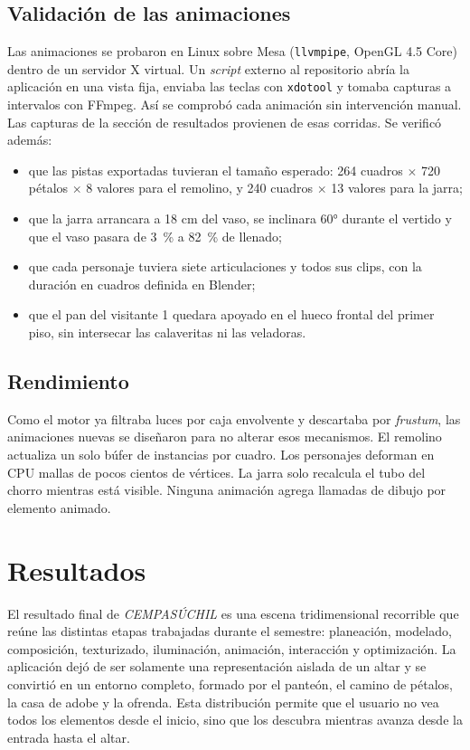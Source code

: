 \documentclass[letter,12pt]{article}
\begin{document}
	\subsection{Validación de las animaciones}
	Las animaciones se probaron en Linux sobre Mesa (\texttt{llvmpipe}, OpenGL 4.5 Core) dentro de un servidor X virtual. Un \textit{script} externo al repositorio abría la aplicación en una vista fija, enviaba las teclas con \texttt{xdotool} y tomaba capturas a intervalos con FFmpeg. Así se comprobó cada animación sin intervención manual. Las capturas de la sección de resultados provienen de esas corridas. Se verificó además:
	\begin{itemize}[leftmargin=*]
		\item que las pistas exportadas tuvieran el tamaño esperado: 264 cuadros $\times$ 720 pétalos $\times$ 8 valores para el remolino, y 240 cuadros $\times$ 13 valores para la jarra;
		\item que la jarra arrancara a 18 cm del vaso, se inclinara 60° durante el vertido y que el vaso pasara de 3~\% a 82~\% de llenado;
		\item que cada personaje tuviera siete articulaciones y todos sus clips, con la duración en cuadros definida en Blender;
		\item que el pan del visitante 1 quedara apoyado en el hueco frontal del primer piso, sin intersecar las calaveritas ni las veladoras.
	\end{itemize}

	\subsection{Rendimiento}
	Como el motor ya filtraba luces por caja envolvente y descartaba por \textit{frustum}, las animaciones nuevas se diseñaron para no alterar esos mecanismos. El remolino actualiza un solo búfer de instancias por cuadro. Los personajes deforman en CPU mallas de pocos cientos de vértices. La jarra solo recalcula el tubo del chorro mientras está visible. Ninguna animación agrega llamadas de dibujo por elemento animado.

\newpage
	\section{Resultados}

El resultado final de \textit{CEMPASÚCHIL} es una escena tridimensional recorrible que reúne las distintas etapas trabajadas durante el semestre: planeación, modelado, composición, texturizado, iluminación, animación, interacción y optimización. La aplicación dejó de ser solamente una representación aislada de un altar y se convirtió en un entorno completo, formado por el panteón, el camino de pétalos, la casa de adobe y la ofrenda. Esta distribución permite que el usuario no vea todos los elementos desde el inicio, sino que los descubra mientras avanza desde la entrada hasta el altar.
\end{document}
